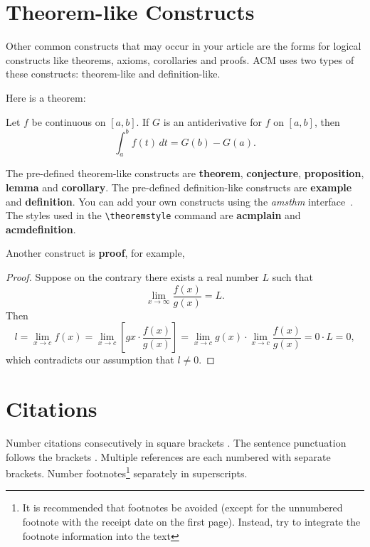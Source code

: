 \documentclass{cocseArticle}
\begin{document}
\section{Theorem-like Constructs}

Other common constructs that may occur in your article are the forms
for logical constructs like theorems, axioms, corollaries and proofs.
ACM uses two types of these constructs:  theorem-like and
definition-like.

Here is a theorem:
\begin{theorem}
	Let $f$ be continuous on $[a,b]$.  If $G$ is
	an antiderivative for $f$ on $[a,b]$, then
	\begin{displaymath}
	\int^b_af(t)\,dt = G(b) - G(a).
	\end{displaymath}
\end{theorem}


The pre-defined theorem-like constructs are \textbf{theorem},
\textbf{conjecture}, \textbf{proposition}, \textbf{lemma} and
\textbf{corollary}.  The pre-defined de\-fi\-ni\-ti\-on-like constructs are
\textbf{example} and \textbf{definition}.  You can add your own
constructs using the \textsl{amsthm} interface~\cite{Amsthm15}.  The
styles used in the \verb|\theoremstyle| command are \textbf{acmplain}
and \textbf{acmdefinition}.

Another construct is \textbf{proof}, for example,

\begin{proof}
	Suppose on the contrary there exists a real number $L$ such that
	\begin{displaymath}
	\lim_{x\rightarrow\infty} \frac{f(x)}{g(x)} = L.
	\end{displaymath}
	Then
	\begin{displaymath}
	l=\lim_{x\rightarrow c} f(x)
	= \lim_{x\rightarrow c}
	\left[ g{x} \cdot \frac{f(x)}{g(x)} \right ]
	= \lim_{x\rightarrow c} g(x) \cdot \lim_{x\rightarrow c}
	\frac{f(x)}{g(x)} = 0\cdot L = 0,
	\end{displaymath}
	which contradicts our assumption that $l\neq 0$.
\end{proof}



\section{Citations}
Number citations consecutively in square brackets \cite{Vachhani2015}. The sentence punctuation follows the brackets \cite{Bts2013}. Multiple references \cite{Bort2010,Ghafoor2015,Samra2008} are each numbered with separate brackets. Number footnotes\footnote{ It is recommended that footnotes be avoided (except for the unnumbered footnote with the receipt date on the first page). Instead, try to integrate the footnote information into the text} separately in superscripts. 
\end{document}
